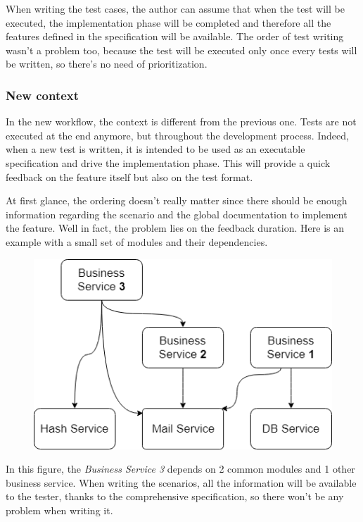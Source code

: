 When writing the test cases, the author can assume that when the test will
be executed, the implementation phase will be completed and therefore all the
features defined in the specification will be available.
The order of test writing wasn't a problem too, because the test will be
executed only once every tests will be written, so there's no need of
prioritization.

\subsubsection{New context}
In the new workflow, the context is different from the previous one.
Tests are not executed at the end anymore, but throughout the development
process.
Indeed, when a new test is written, it is intended to be used as an executable
specification and drive the implementation phase.
This will provide a quick feedback on the feature itself but also on the test
format.

At first glance, the ordering doesn't really matter since there should be
enough information regarding the scenario and the global documentation to
implement the feature.
Well in fact, the problem lies on the feedback duration.
Here is an example with a small set of modules and their dependencies.

\begin{figure}
    \includegraphics[width=\textwidth]{../../resources/images/solution/module_dependencies.png}
    \centering
\end{figure}

In this figure, the \textit{Business Service 3} depends on 2 common modules
and 1 other business service.
When writing the scenarios, all the information will be available to the tester,
thanks to the comprehensive specification, so there won't be any problem when
writing it.

